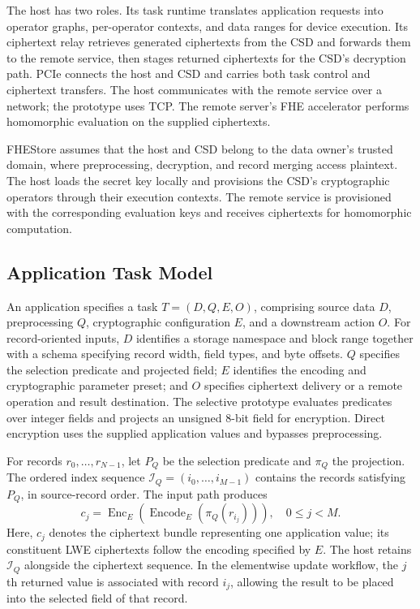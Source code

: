 The host has two roles. Its task runtime translates application requests into operator graphs, per-operator contexts, and data ranges for device execution. Its ciphertext relay retrieves generated ciphertexts from the CSD and forwards them to the remote service, then stages returned ciphertexts for the CSD's decryption path. PCIe connects the host and CSD and carries both task control and ciphertext transfers. The host communicates with the remote service over a network; the prototype uses TCP. The remote server's FHE accelerator performs homomorphic evaluation on the supplied ciphertexts.

FHEStore assumes that the host and CSD belong to the data owner's trusted domain, where preprocessing, decryption, and record merging access plaintext. The host loads the secret key locally and provisions the CSD's cryptographic operators through their execution contexts. The remote service is provisioned with the corresponding evaluation keys and receives ciphertexts for homomorphic computation.

\subsection{Application Task Model}
\label{subsec:application-task}

An application specifies a task $T=(D,Q,E,O)$, comprising source data $D$, preprocessing $Q$, cryptographic configuration $E$, and a downstream action $O$. For record-oriented inputs, $D$ identifies a storage namespace and block range together with a schema specifying record width, field types, and byte offsets. $Q$ specifies the selection predicate and projected field; $E$ identifies the encoding and cryptographic parameter preset; and $O$ specifies ciphertext delivery or a remote operation and result destination. The selective prototype evaluates predicates over integer fields and projects an unsigned 8-bit field for encryption. Direct encryption uses the supplied application values and bypasses preprocessing.

For records $r_0,\ldots,r_{N-1}$, let $P_Q$ be the selection predicate and $\pi_Q$ the projection. The ordered index sequence $\mathcal{I}_Q=(i_0,\ldots,i_{M-1})$ contains the records satisfying $P_Q$, in source-record order. The input path produces
\begin{equation}
  c_j = \operatorname{Enc}_{E}\!\left(
    \operatorname{Encode}_{E}\!\left(\pi_Q(r_{i_j})\right)
  \right),\quad 0\leq j<M.
  \label{eq:task-ciphertexts}
\end{equation}
Here, $c_j$ denotes the ciphertext bundle representing one application value; its constituent LWE ciphertexts follow the encoding specified by $E$. The host retains $\mathcal{I}_Q$ alongside the ciphertext sequence. In the elementwise update workflow, the $j$th returned value is associated with record $i_j$, allowing the result to be placed into the selected field of that record.

